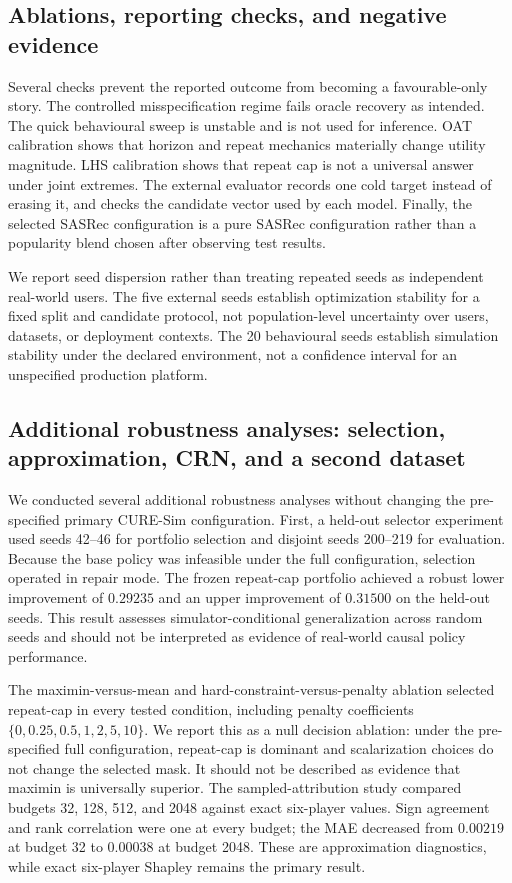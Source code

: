 \documentclass[pdflatex,sn-mathphys-num]{sn-jnl}
\theoremstyle{thmstyleone}
\theoremstyle{thmstyletwo}
\theoremstyle{thmstylethree}
\begin{document}
\subsection{Ablations, reporting checks, and negative evidence}\label{sec:ablations}

Several checks prevent the reported outcome from becoming a favourable-only story. The controlled misspecification regime fails oracle recovery as intended. The quick behavioural sweep is unstable and is not used for inference. OAT calibration shows that horizon and repeat mechanics materially change utility magnitude. LHS calibration shows that repeat cap is not a universal answer under joint extremes. The external evaluator records one cold target instead of erasing it, and checks the candidate vector used by each model. Finally, the selected SASRec configuration is a pure SASRec configuration rather than a popularity blend chosen after observing test results.

We report seed dispersion rather than treating repeated seeds as independent real-world users. The five external seeds establish optimization stability for a fixed split and candidate protocol, not population-level uncertainty over users, datasets, or deployment contexts. The 20 behavioural seeds establish simulation stability under the declared environment, not a confidence interval for an unspecified production platform.

\subsection{Additional robustness analyses: selection, approximation, CRN, and a second dataset}\label{sec:reviewer-revision}

We conducted several additional robustness analyses without changing the pre-specified primary CURE-Sim configuration. First, a held-out selector experiment used seeds 42--46 for portfolio selection and disjoint seeds 200--219 for evaluation. Because the base policy was infeasible under the full configuration, selection operated in repair mode. The frozen repeat-cap portfolio achieved a robust lower improvement of $0.29235$ and an upper improvement of $0.31500$ on the held-out seeds. This result assesses simulator-conditional generalization across random seeds and should not be interpreted as evidence of real-world causal policy performance.

The maximin-versus-mean and hard-constraint-versus-penalty ablation selected repeat-cap in every tested condition, including penalty coefficients $\{0,0.25,0.5,1,2,5,10\}$. We report this as a null decision ablation: under the pre-specified full configuration, repeat-cap is dominant and scalarization choices do not change the selected mask. It should not be described as evidence that maximin is universally superior. The sampled-attribution study compared budgets 32, 128, 512, and 2048 against exact six-player values. Sign agreement and rank correlation were one at every budget; the MAE decreased from $0.00219$ at budget 32 to $0.00038$ at budget 2048. These are approximation diagnostics, while exact six-player Shapley remains the primary result.
\end{document}
